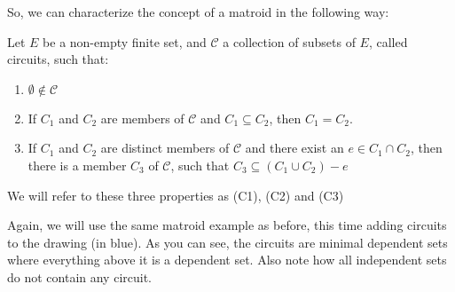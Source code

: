 So, we can characterize the concept of a matroid in the following way:

\begin{defn}
    Let $E$ be a non-empty finite set, and $\mathcal{C}$ a collection of subsets of $E$, called circuits, such that:

    \begin{enumerate}
        \item $\emptyset \notin \mathcal{C}$

        \item If $C_1$ and $C_2$ are members of $\mathcal{C}$ and $C_1 \subseteq C_2$, then $C_1 = C_2$.

        \item If $C_1$ and $C_2$ are distinct members of $\mathcal{C}$ and there exist an $e \in C_1 \cap C_2$, then there is a member $C_3$ of $\mathcal{C}$, such that $C_3 \subseteq (C_1  \cup C_2) - e$
    \end{enumerate}
    We will refer to these three properties as (C1), (C2) and (C3)
    
\end{defn}

Again, we will use the same matroid example as before, this time adding circuits to the drawing (in blue). As you can see, the circuits are minimal dependent sets where everything above it is a dependent set. Also note how all independent sets do not contain any circuit.

\begin{center}
\end{center}


